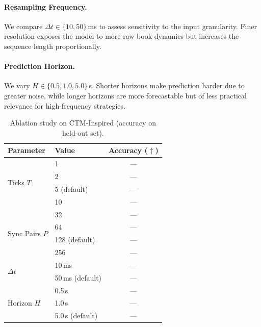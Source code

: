 \documentclass[11pt]{article}
\begin{document}
\paragraph{Resampling Frequency.}
We compare $\Delta t \in \{10, 50\}$\,ms to assess sensitivity to the
input granularity. Finer resolution exposes the model to more raw book
dynamics but increases the sequence length proportionally.

\paragraph{Prediction Horizon.}
We vary $H \in \{0.5, 1.0, 5.0\}$\,s. Shorter horizons make prediction
harder due to greater noise, while longer horizons are more forecastable
but of less practical relevance for high-frequency strategies.

\begin{table}[h]
\centering
\caption{Ablation study on CTM-Inspired (accuracy on held-out set).}
\label{tab:ablations}
\begin{tabular}{llc}
  \toprule
  Parameter              & Value       & Accuracy ($\uparrow$) \\
  \midrule
  \multirow{4}{*}{Ticks $T$}
                         & 1           & ---                   \\
                         & 2           & ---                   \\
                         & 5 (default) & ---                   \\
                         & 10          & ---                   \\
  \midrule
  \multirow{4}{*}{Sync Pairs $P$}
                         & 32          & ---                   \\
                         & 64          & ---                   \\
                         & 128 (default) & ---                 \\
                         & 256         & ---                   \\
  \midrule
  \multirow{2}{*}{$\Delta t$}
                         & 10\,ms      & ---                   \\
                         & 50\,ms (default) & ---              \\
  \midrule
  \multirow{3}{*}{Horizon $H$}
                         & 0.5\,s      & ---                   \\
                         & 1.0\,s      & ---                   \\
                         & 5.0\,s (default) & ---              \\
  \bottomrule
\end{tabular}
\end{table}
\end{document}
